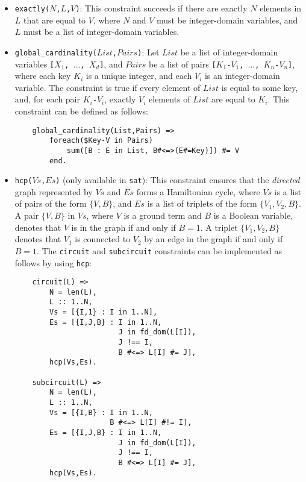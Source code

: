 \begin{itemize}
\item \texttt{exactly($N$,$L$,$V$)}: This constraint succeeds if there are exactly $N$ elements in $L$ that are equal to $V$, where $N$ and $V$ must be integer-domain variables, and $L$ must be a list of integer-domain variables.

\item \texttt{global\_cardinality($List$,$Pairs$)}: Let $List$ be a list of integer-domain variables \texttt{[$X_1$, $\ldots$, $X_d$]}, and $Pairs$ be a list of pairs \texttt{[$K_1$-$V_1$, $\ldots$, $K_n$-$V_n$]}, where each key \texttt{$K_i$} is a unique integer, and each \texttt{$V_i$} is an integer-domain variable. The constraint is true if every element of $List$ is equal to some key, and, for each pair \texttt{$K_i$-$V_i$}, exactly \texttt{$V_i$} elements of $List$ are equal to \texttt{$K_i$}. This constraint can be defined as follows:
\begin{verbatim}
    global_cardinality(List,Pairs) =>
        foreach($Key-V in Pairs) 
            sum([B : E in List, B#<=>(E#=Key)]) #= V
        end.
\end{verbatim}

\item \texttt{hcp($Vs$,$Es$)} (only available in \texttt{sat}): This constraint ensures that the \textit{directed} graph represented by $Vs$ and $Es$ forms a Hamiltonian cycle, where $Vs$ is a list of pairs of the form $\{V,B\}$, and $Es$ is a list of triplets of the form $\{V_1,V_2,B\}$. A pair $\{V,B\}$ in $Vs$, where $V$ is a ground term and $B$ is a Boolean variable, denotes that $V$ is in the graph if and only if $B = 1$. A triplet $\{V_1,V_2,B\}$ denotes that $V_1$ is connected to $V_2$  by an edge in the graph if and only if $B = 1$. The \texttt{circuit} and \texttt{subcircuit} constraints can be implemented as follows by using \texttt{hcp}:
\begin{verbatim}
    circuit(L) =>
        N = len(L),
        L :: 1..N,
        Vs = [{I,1} : I in 1..N],
        Es = [{I,J,B} : I in 1..N, 
                        J in fd_dom(L[I]), 
                        J !== I, 
                        B #<=> L[I] #= J],
        hcp(Vs,Es).

    subcircuit(L) =>
        N = len(L),
        L :: 1..N,
        Vs = [{I,B} : I in 1..N, 
                      B #<=> L[I] #!= I],
        Es = [{I,J,B} : I in 1..N, 
                        J in fd_dom(L[I]), 
                        J !== I, 
                        B #<=> L[I] #= J],
        hcp(Vs,Es).
\end{verbatim}


\end{itemize}
